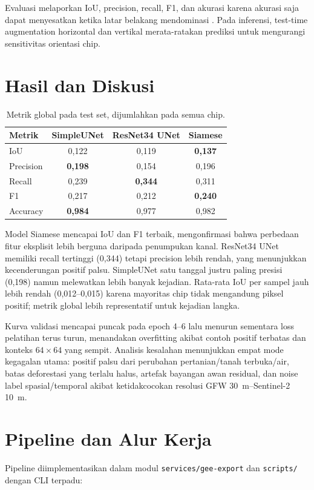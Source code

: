 \documentclass[10pt,a4paper,onecolumn]{article}
\begin{document}
Evaluasi melaporkan IoU, precision, recall, F1, dan akurasi karena
akurasi saja dapat menyesatkan ketika latar belakang mendominasi
\cite{powers2011evaluation}. Pada inferensi, test-time augmentation
horizontal dan vertikal merata-ratakan prediksi untuk mengurangi
sensitivitas orientasi chip.

\section{Hasil dan Diskusi}
\begin{table}[ht]
\centering
\caption{Metrik global pada test set, dijumlahkan pada semua chip.}
\label{tab:results}
\small
\begin{tabular}{lccc}
\toprule
Metrik & SimpleUNet & ResNet34 UNet & Siamese \\
\midrule
IoU       & 0,122 & 0,119 & \textbf{0,137} \\
Precision & \textbf{0,198} & 0,154 & 0,196 \\
Recall    & 0,239 & \textbf{0,344} & 0,311 \\
F1        & 0,217 & 0,212 & \textbf{0,240} \\
Accuracy  & \textbf{0,984} & 0,977 & 0,982 \\
\bottomrule
\end{tabular}
\end{table}

Model Siamese mencapai IoU dan F1 terbaik, mengonfirmasi bahwa perbedaan
fitur eksplisit lebih berguna daripada penumpukan kanal. ResNet34 UNet
memiliki recall tertinggi ({0,344}) tetapi precision lebih rendah, yang
menunjukkan kecenderungan positif palsu. SimpleUNet satu tanggal justru
paling presisi ({0,198}) namun melewatkan lebih banyak kejadian. Rata-rata
IoU per sampel jauh lebih rendah ({0,012--0,015}) karena mayoritas chip
tidak mengandung piksel positif; metrik global lebih representatif untuk
kejadian langka.

Kurva validasi mencapai puncak pada epoch 4--6 lalu menurun sementara
loss pelatihan terus turun, menandakan overfitting akibat contoh positif
terbatas dan konteks $64\times64$ yang sempit. Analisis kesalahan
menunjukkan empat mode kegagalan utama: positif palsu dari perubahan
pertanian/tanah terbuka/air, batas deforestasi yang terlalu halus,
artefak bayangan awan residual, dan noise label spasial/temporal akibat
ketidakcocokan resolusi GFW 30~m--Sentinel-2 10~m.

\section{Pipeline dan Alur Kerja}
Pipeline diimplementasikan dalam modul \texttt{services/gee-export} dan
\texttt{scripts/} dengan CLI terpadu:
\end{document}
